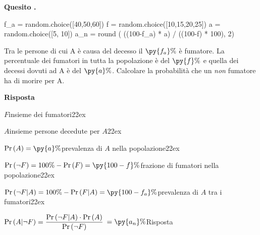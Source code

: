 \documentclass[11pt,twoside,a4paper]{article}
\def\Pr{{\rm Pr\,}}
\newcounter{quesito}
\newenvironment{question}{\bigskip\addtocounter{quesito}{1}\par\textbf{Quesito \thequesito.}}{\vspace{\parskip}}
\newenvironment{answer}{\par\textbf{Risposta\quad}}{\vspace{\parskip}}
\begin{document}
\begin{question}
\def\Pr{{\rm Pr\,}}
\begin{pycode}
f_a = random.choice([40,50,60])
f = random.choice([10,15,20,25])
a = random.choice([5, 10])
a_n = round ( ((100-f_a) * a) / ((100-f) * 100), 2)
\end{pycode}
Tra le persone di cui A è causa del decesso il $\py{f_a}\%$ è fumatore.  La percentuale dei fumatori in tutta la popolazione è del $\py{f}\%$ e quella dei decessi dovuti ad A è del $\py{a}\%$. Calcolare la probabilità che un \textit{non\/} fumatore ha di morire per A.
\begin{answer}

$F$\hfill insieme dei fumatori\kern22ex

$A$\hfill insieme persone decedute per $A$\kern22ex

$\Pr(A)=\py{a}\%$\hfill prevalenza di $A$ nella popolazione\kern22ex

$\Pr(\neg F)=100\% - \Pr(F) =\py{100-f}\%$\hfill frazione di fumatori nella popolazione\kern22ex

$\Pr(\neg F|A)=100\%-\Pr(F|A)  =\py{100-f_a}\%$\hfill prevalenza di $A$ tra i fumatori\kern22ex

$\Pr(A|\neg F)=\dfrac{\Pr(\neg F|A)\cdot \Pr(A)}{\Pr(\neg F)}$  {\color{blue}$=\py{a_n}\%$\hfill Risposta}

\end{answer}
\end{question}
\end{document}
